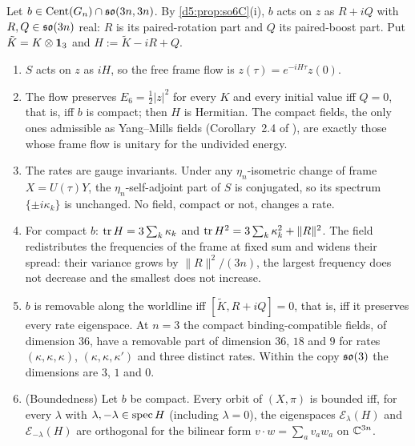\begin{theorem}
\label{d7:thm:schr}
Let $b\in\operatorname{Cent}(G_n)\cap\mathfrak{so}(3n,3n)$. By \cref{d5:prop:so6C}(i), $b$ acts on $z$ as $R+iQ$ with $R,Q\in\mathfrak{so}(3n)$ real: $R$ is
its paired-rotation part and $Q$ its paired-boost part. Put $\tilde K=K\otimes\mathbf 1_3$ and $H:=\tilde K-iR+Q$.
\begin{enumerate}[label=(\roman*),leftmargin=2.2em]
\item $S$ acts on $z$ as $iH$, so the free frame flow is $z(\tau)=e^{-iH\tau}z(0)$.
\item The flow preserves $E_6=\tfrac12|z|^2$ for every $K$ and every initial value iff $Q=0$, that is, iff $b$ is compact; then $H$ is Hermitian. The
compact fields, the only ones admissible as Yang--Mills fields (Corollary~2.4 of \cite{ES17}), are exactly those whose frame flow is unitary for the
undivided energy.
\item The rates are gauge invariants. Under any $\eta_n$-isometric change of frame $X=U(\tau)Y$, the $\eta_n$-self-adjoint part of $S$ is conjugated,
so its spectrum $\{\pm i\kappa_k\}$ is unchanged. No field, compact or not, changes a rate.
\item For compact $b$: $\operatorname{tr} H=3\sum_k\kappa_k$ and $\operatorname{tr} H^2=3\sum_k\kappa_k^2+\|R\|^2$. The field redistributes the frequencies of the frame at fixed
sum and widens their spread: their variance grows by $\|R\|^2/(3n)$, the largest frequency does not decrease and the smallest does not increase.
\item $b$ is removable along the worldline iff $[\tilde K,R+iQ]=0$, that is, iff it preserves every rate eigenspace. At $n=3$ the compact
binding-compatible fields, of dimension $36$, have a removable part of dimension $36$, $18$ and $9$ for rates $(\kappa,\kappa,\kappa)$, $(\kappa,\kappa,\kappa')$
and three distinct rates. Within the copy $\mathfrak{so}(3)$ the dimensions are $3$, $1$ and $0$.
\item (Boundedness) Let $b$ be compact. Every orbit of $(X,\pi)$ is bounded iff, for every $\lambda$ with $\lambda,-\lambda\in\operatorname{spec} H$ (including $\lambda=0$),
the eigenspaces $\mathcal E_\lambda(H)$ and $\mathcal E_{-\lambda}(H)$ are orthogonal for the bilinear form $v\cdot w=\sum_av_aw_a$ on $\mathbb{C}^{3n}$.
\end{enumerate}
\end{theorem}

